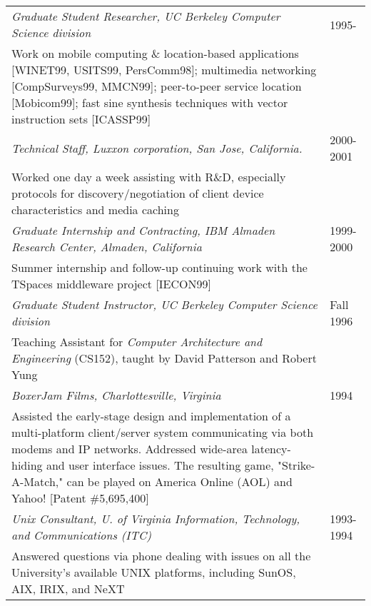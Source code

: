 \begin{tabular}{p{5.2in}@{\hspace{1.5cm}}l}
    \em Graduate Student Researcher, UC Berkeley Computer Science division
                                                                 & 1995- \\
       Work on mobile computing \& location-based applications 
       [WINET99, USITS99, PersComm98]; 
       multimedia networking [CompSurveys99, MMCN99];
       peer-to-peer service location [Mobicom99];
       fast sine synthesis techniques with vector instruction 
       sets [ICASSP99] \\[9pt]

    \em Technical Staff, Luxxon corporation, San Jose, California. & 2000-2001 \\
       Worked one day a week assisting with R\&D, especially
       protocols for discovery/negotiation of client
       device characteristics and media caching \\[9pt]

    \em Graduate Internship and Contracting, IBM Almaden Research Center, 
          Almaden, California
                                                              & 1999-2000 \\
       Summer internship and follow-up continuing work with
       the TSpaces middleware project [IECON99] \\[9pt]

    \em Graduate Student Instructor, UC Berkeley Computer Science division
                                                                 & Fall 1996 \\
       Teaching Assistant for {\em Computer Architecture and
       Engineering} (CS152), taught by David Patterson and
       Robert Yung \\[9pt]

    \em BoxerJam Films, Charlottesville, Virginia                & 1994 \\
       Assisted the early-stage design and implementation of 
       a multi-platform
       client/server system communicating via both modems and IP
       networks.  Addressed wide-area latency-hiding and user interface
       issues.  The resulting game, "Strike-A-Match,"
       can be played on America Online (AOL) and Yahoo! 
       [Patent \#5,695,400] \\[9pt]

    \em Unix Consultant, U. of Virginia Information, 
         Technology, and Communications  (ITC)              & 1993-1994 \\
       Answered questions via phone dealing with issues on all the
       University's available UNIX platforms, including SunOS,
       AIX, IRIX, and NeXT \\[9pt]


\end{tabular}
